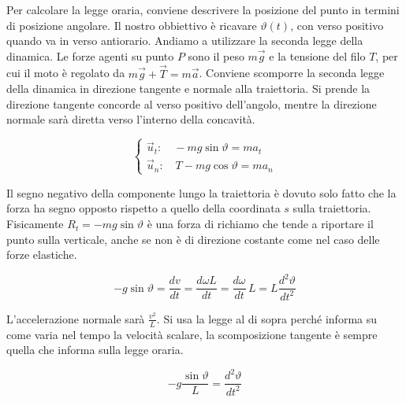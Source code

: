 \begin{figure}[htpb]
\end{figure}

Per calcolare la legge oraria, conviene descrivere la posizione del punto in termini di posizione angolare. Il nostro obbiettivo è ricavare $\vartheta (t)$, con verso positivo quando va in verso antiorario. Andiamo a utilizzare la seconda legge della dinamica. Le forze agenti su punto $P$ sono il peso $m\vec{g}$ e la tensione del filo $T$, per cui il moto è regolato da $m\vec{g}+\vec{T}=m\vec{a}$. Conviene scomporre la seconda legge della dinamica in direzione tangente e normale alla traiettoria. Si prende la direzione tangente concorde al verso positivo dell'angolo, mentre la direzione normale sarà diretta verso l'interno della concavità.

\[
	\begin{cases} \vec{u}_t: \quad -mg\sin\vartheta=ma_t \\ \vec{u}_n: \quad T-mg\cos\vartheta=ma_n \end{cases}
\]

Il segno negativo della componente lungo la traiettoria è dovuto solo fatto che la forza ha segno opposto rispetto a quello della coordinata $s$ sulla traiettoria. Fisicamente $R_t=-mg\sin\vartheta$ è una forza di richiamo che tende a riportare il punto sulla verticale, anche se non è di direzione costante come nel caso delle forze elastiche.

\[
	-g\sin\vartheta=\frac{dv}{dt}=\frac{d\omega L}{dt}=\frac{d\omega}{dt}\,L=L\frac{d^2\vartheta}{dt^2}
\]

L'accelerazione normale sarà $\frac{v^2}{L}$. Si usa la legge al di sopra perché informa su come varia nel tempo la velocità scalare, la scomposizione tangente è sempre quella che informa sulla legge oraria.

\[
	-g\frac{\sin\vartheta}{L}=\frac{d^2\vartheta}{dt^2}
\]

